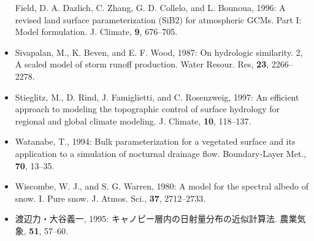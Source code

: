 \begin{itemize}
  Field, D. A. Dazlich, C. Zhang, G. D. Collelo, and L. Bounoua, 1996: A
  revised land surface parameterization (SiB2) for atmospheric GCMs.
  Part I: Model formulation. {J. Climate}, {\textbf{9}}, 676--705.
\item
  Sivapalan, M., K. Beven, and E. F. Wood, 1987: On hydrologic
  similarity. 2, A scaled model of storm runoff production. {Water
  Resour. Res}, {\textbf{23}}, 2266--2278.
\item
  Stieglitz, M., D. Rind, J. Famiglietti, and C. Rosenzweig, 1997: An
  efficient approach to modeling the topographic control of surface
  hydrology for regional and global climate modeling. {J. Climate},
  {\textbf{10}}, 118--137.
\item
  Watanabe, T., 1994: Bulk parameterization for a vegetated surface and
  its application to a simulation of nocturnal drainage flow.
  {Boundary-Layer Met.}, {\textbf{70}}, 13--35.
\item
  Wiscombe, W. J., and S. G. Warren, 1980: A model for the spectral
  albedo of snow. I. Pure snow. {J. Atmos. Sci.}, {\textbf{37}},
  2712--2733.
\item
  渡辺力・大谷義一, 1995: キャノピー層内の日射量分布の近似計算法.
  {農業気象}, {\textbf{51}}, 57--60.
\end{itemize}
